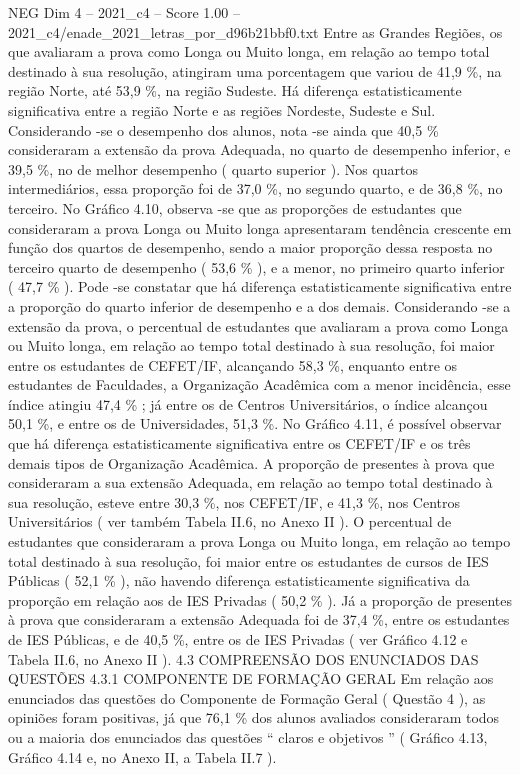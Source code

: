 \begin{textsample}{NEG Dim 4 – 2021\_c4 – Score 1.00 – 2021\_c4/enade\_2021\_letras\_por\_d96b21bbf0.txt}
Entre as Grandes Regiões, os que avaliaram a prova como Longa ou Muito longa, em relação ao tempo total destinado à sua resolução, atingiram uma porcentagem que variou de 41,9 \%, na região Norte, até 53,9 \%, na região Sudeste.
Há diferença estatisticamente significativa entre a região Norte e as regiões Nordeste, Sudeste e Sul.
Considerando -se o desempenho dos alunos, nota -se ainda que 40,5 \% consideraram a extensão da prova Adequada, no quarto de desempenho inferior, e 39,5 \%, no de melhor desempenho ( quarto superior ).
Nos quartos intermediários, essa proporção foi de 37,0 \%, no segundo quarto, e de 36,8 \%, no terceiro.
No Gráfico 4.10, observa -se que as proporções de estudantes que consideraram a prova Longa ou Muito longa apresentaram tendência crescente em função dos quartos de desempenho, sendo a maior proporção dessa resposta no terceiro quarto de desempenho ( 53,6 \% ), e a menor, no primeiro quarto inferior ( 47,7 \% ).
Pode -se constatar que há diferença estatisticamente significativa entre a proporção do quarto inferior de desempenho e a dos demais.
Considerando -se a extensão da prova, o percentual de estudantes que avaliaram a prova como Longa ou Muito longa, em relação ao tempo total destinado à sua resolução, foi maior entre os estudantes de CEFET/IF, alcançando 58,3 \%, enquanto entre os estudantes de Faculdades, a Organização Acadêmica com a menor incidência, esse índice atingiu 47,4 \% ; já entre os de Centros Universitários, o índice alcançou 50,1 \%, e entre os de Universidades, 51,3 \%.
No Gráfico 4.11, é possível observar que há diferença estatisticamente significativa entre os CEFET/IF e os três demais tipos de Organização Acadêmica.
A proporção de presentes à prova que consideraram a sua extensão Adequada, em relação ao tempo total destinado à sua resolução, esteve entre 30,3 \%, nos CEFET/IF, e 41,3 \%, nos Centros Universitários ( ver também Tabela II.6, no Anexo II ).
O percentual de estudantes que consideraram a prova Longa ou Muito longa, em relação ao tempo total destinado à sua resolução, foi maior entre os estudantes de cursos de IES Públicas ( 52,1 \% ), não havendo diferença estatisticamente significativa da proporção em relação aos de IES Privadas ( 50,2 \% ).
Já a proporção de presentes à prova que consideraram a extensão Adequada foi de 37,4 \%, entre os estudantes de IES Públicas, e de 40,5 \%, entre os de IES Privadas ( ver Gráfico 4.12 e Tabela II.6, no Anexo II ). 4.3 COMPREENSÃO DOS ENUNCIADOS DAS QUESTÕES 4.3.1 COMPONENTE DE FORMAÇÃO GERAL Em relação aos enunciados das questões do Componente de Formação Geral ( Questão 4 ), as opiniões foram positivas, já que 76,1 \% dos alunos avaliados consideraram todos ou a maioria dos enunciados das questões “ claros e objetivos ” ( Gráfico 4.13, Gráfico 4.14 e, no Anexo II, a Tabela II.7 ).

\end{textsample}

